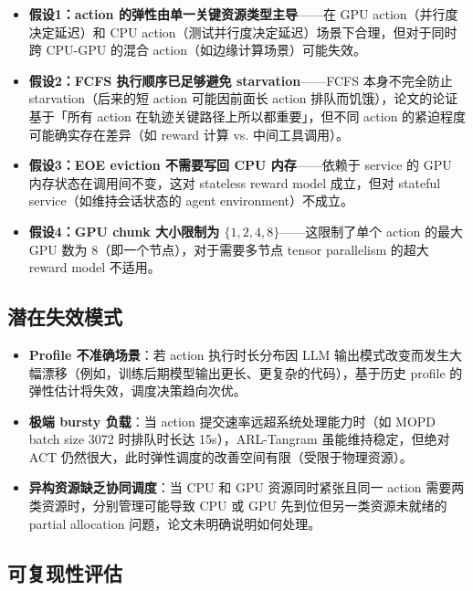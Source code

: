 \documentclass[11pt, a4paper]{article}
\begin{document}
\begin{itemize}
  \item \textbf{假设1：action 的弹性由单一关键资源类型主导}——在 GPU action（并行度决定延迟）和 CPU action（测试并行度决定延迟）场景下合理，但对于同时跨 CPU-GPU 的混合 action（如边缘计算场景）可能失效。

  \item \textbf{假设2：FCFS 执行顺序已足够避免 starvation}——FCFS 本身不完全防止 starvation（后来的短 action 可能因前面长 action 排队而饥饿），论文的论证基于「所有 action 在轨迹关键路径上所以都重要」，但不同 action 的紧迫程度可能确实存在差异（如 reward 计算 vs. 中间工具调用）。

  \item \textbf{假设3：EOE eviction 不需要写回 CPU 内存}——依赖于 service 的 GPU 内存状态在调用间不变，这对 stateless reward model 成立，但对 stateful service（如维持会话状态的 agent environment）不成立。

  \item \textbf{假设4：GPU chunk 大小限制为 $\{1,2,4,8\}$}——这限制了单个 action 的最大 GPU 数为 8（即一个节点），对于需要多节点 tensor parallelism 的超大 reward model 不适用。
\end{itemize}

\subsection{潜在失效模式}

\begin{itemize}
  \item \textbf{Profile 不准确场景}：若 action 执行时长分布因 LLM 输出模式改变而发生大幅漂移（例如，训练后期模型输出更长、更复杂的代码），基于历史 profile 的弹性估计将失效，调度决策趋向次优。

  \item \textbf{极端 bursty 负载}：当 action 提交速率远超系统处理能力时（如 MOPD batch size 3072 时排队时长达 15s），ARL-Tangram 虽能维持稳定，但绝对 ACT 仍然很大，此时弹性调度的改善空间有限（受限于物理资源）。

  \item \textbf{异构资源缺乏协同调度}：当 CPU 和 GPU 资源同时紧张且同一 action 需要两类资源时，分别管理可能导致 CPU 或 GPU 先到位但另一类资源未就绪的 partial allocation 问题，论文未明确说明如何处理。
\end{itemize}

\subsection{可复现性评估}
\end{document}
